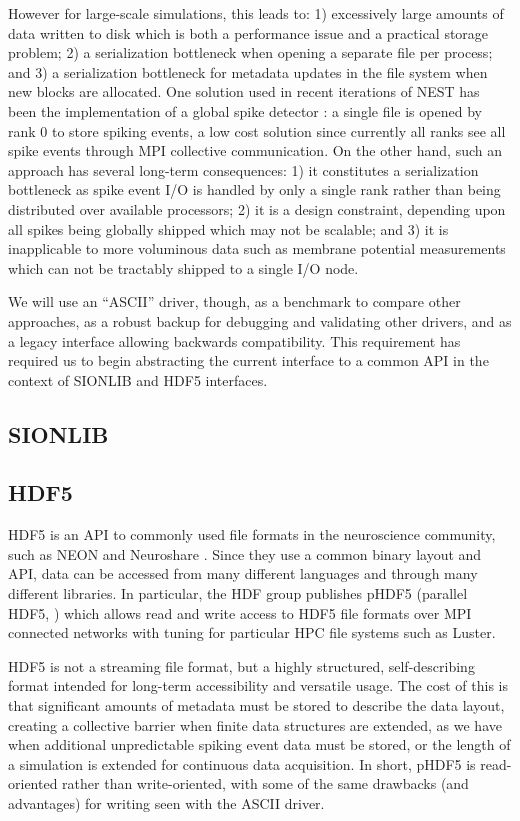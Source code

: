 \documentclass[]{YIC2015}
\begin{document}
However for large-scale simulations, this leads to: 1) excessively
large amounts of data written to disk which is both a performance
issue and a practical storage problem; 2) a serialization bottleneck
when opening a separate file per process; and 3) a serialization
bottleneck for metadata updates in the file system when new blocks are
allocated. One solution used in recent iterations of NEST has been the
implementation of a global spike detector \cite{gsd}: a single file is
opened by rank 0 to store spiking events, a low cost solution since
currently all ranks see all spike events through MPI collective
communication. On the other hand, such an approach has several
long-term consequences: 1) it constitutes a serialization bottleneck
as spike event I/O is handled by only a single rank rather than being
distributed over available processors; 2) it is a design constraint,
depending upon all spikes being globally shipped which may not be
scalable; and 3) it is inapplicable to more voluminous data such as
membrane potential measurements which can not be tractably shipped to
a single I/O node.

We will use an ``ASCII'' driver, though, as a benchmark to compare
other approaches, as a robust backup for debugging and validating
other drivers, and as a legacy interface allowing backwards
compatibility. This requirement has required us to begin abstracting
the current interface to a common API in the context of SIONLIB and
HDF5 interfaces.

\subsection{SIONLIB}

\subsection{HDF5}
HDF5 is an API to commonly used file formats in the neuroscience
community, such as NEON \cite{neon} and Neuroshare \cite{neuroshare}.
Since they use a common binary layout and API, data can be accessed
from many different languages and through many different libraries. In
particular, the HDF group publishes pHDF5 (parallel HDF5,
\cite{phdf5}) which allows read and write access to HDF5 file formats
over MPI connected networks with tuning for particular HPC file
systems such as Luster. 

HDF5 is not a streaming file format, but a highly structured,
self-describing format intended for long-term accessibility and
versatile usage. The cost of this is that significant amounts of
metadata must be stored to describe the data layout, creating a
collective barrier when finite data structures are extended, as we
have when additional unpredictable spiking event data must be stored,
or the length of a simulation is extended for continuous data
acquisition. In short, pHDF5 is read-oriented rather than
write-oriented, with some of the same drawbacks (and advantages) for
writing seen with the ASCII driver.
\end{document}
